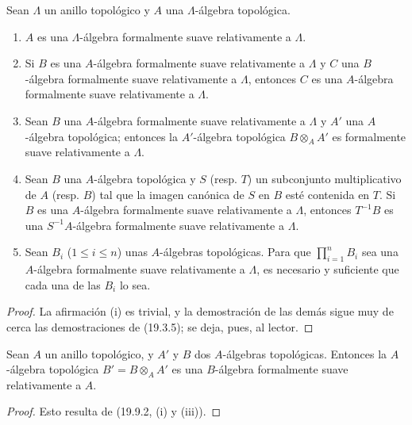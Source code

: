 \begin{proposition}[19.9.2]
\label{0.19.9.2-fr}
Sean $\Lambda$ un anillo topológico y $A$ una $\Lambda$-álgebra topológica.
\begin{enumerate}
  \item[\textup{(i)}] $A$ es una $\Lambda$-álgebra formalmente suave relativamente a
  $\Lambda$.
  \item[\textup{(ii)}] Si $B$ es una $A$-álgebra formalmente suave relativamente a
  $\Lambda$ y $C$ una $B$-álgebra formalmente suave relativamente a $\Lambda$,
  entonces $C$ es una $A$-álgebra formalmente suave relativamente a $\Lambda$.
  \item[\textup{(iii)}] Sean $B$ una $A$-álgebra formalmente suave relativamente a
  $\Lambda$ y $A'$ una $A$-álgebra topológica; entonces la $A'$-álgebra
  topológica $B\otimes_A A'$ es formalmente suave relativamente a $\Lambda$.
  \item[\textup{(iv)}] Sean $B$ una $A$-álgebra topológica y $S$ \textup{(resp. $T$)} un
  subconjunto multiplicativo de $A$ \textup{(resp. $B$)} tal que la imagen canónica de
  $S$ en $B$ esté contenida en $T$. Si $B$ es una $A$-álgebra formalmente suave
  relativamente a $\Lambda$, entonces $T^{-1}B$ es una $S^{-1}A$-álgebra
  formalmente suave relativamente a $\Lambda$.
  \item[\textup{(v)}] Sean $B_i$ ($1\leq i\leq n$) unas $A$-álgebras topológicas. Para
  que $\prod_{i=1}^n B_i$ sea una $A$-álgebra formalmente suave relativamente a
  $\Lambda$, es necesario y suficiente que cada una de las $B_i$ lo sea.
\end{enumerate}
\end{proposition}

\begin{proof}
La afirmación (i) es trivial, y la demostración de las demás sigue muy de cerca
las demostraciones de (19.3.5); se deja, pues, al lector.
\end{proof}

\begin{corollary}[19.9.3]
\label{0.19.9.3-fr}
Sean $A$ un anillo topológico, y $A'$ y $B$ dos $A$-álgebras topológicas.
Entonces la $A$-álgebra topológica $B'=B\otimes_A A'$ es una $B$-álgebra
formalmente suave relativamente a $A$.
\end{corollary}

\begin{proof}
Esto resulta de (19.9.2, (i) y (iii)).
\end{proof}

